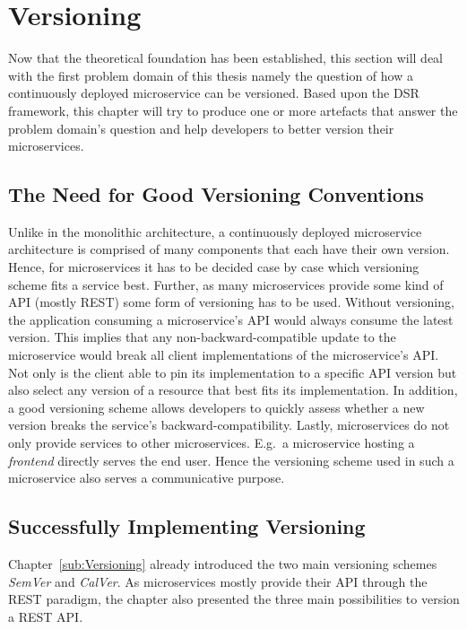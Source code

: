 
\section{Versioning}%
\label{sec:Versioning}

Now that the theoretical foundation has been established, this section will
deal with the first problem domain of this thesis namely the question of how a
continuously deployed microservice can be versioned. Based upon the \ac{DSR}
framework, this chapter will try to produce one or more artefacts that answer
the problem domain's question and help developers to better version their
microservices.

\subsection{The Need for Good Versioning Conventions}%
\label{sub:The_Need_for_Good_Versioning_Conventions}
Unlike in the monolithic architecture, a continuously deployed microservice
architecture is comprised of many components that each have their own version.
Hence, for microservices it has to be decided case by case which versioning
scheme fits a service best. Further, as many microservices provide some kind of
\ac{API} (mostly \ac{REST}) some form of versioning has to be used. Without
versioning, the application consuming a microservice's \ac{API} would always
consume the latest version. This implies that any non-backward-compatible
update to the microservice would break all client implementations of the
microservice's \ac{API}. Not only is the client able to pin its implementation
to a specific \ac{API} version but also select any version of a resource that
best fits its implementation. In addition, a good versioning scheme allows
developers to quickly assess whether a new version breaks the service's
backward-compatibility. Lastly, microservices do not only provide services to
other microservices. E.g.\ a microservice hosting a \textit{frontend} directly
serves the end user. Hence the versioning scheme used in such a microservice
also serves a communicative purpose.


\subsection{Successfully Implementing Versioning}%
\label{sub:Successfully_Implementing_Versioning}
Chapter~\ref{sub:Versioning} already introduced the two main versioning schemes
\textit{SemVer} and \textit{CalVer}. As microservices mostly provide their
\ac{API} through the \ac{REST} paradigm, the chapter also presented the three
main possibilities to version a \ac{REST} \ac{API}.


